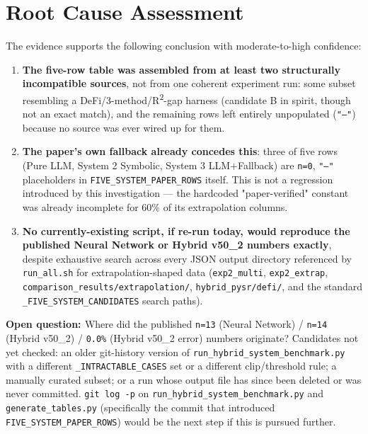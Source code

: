 \documentclass[11pt]{article}
\newcommand{\open}[1]{\par\noindent\textbf{\textcolor{orange!80!black}{Open question: }}#1\par}
\newcommand{\code}[1]{\texttt{#1}}
\begin{document}
\section{Root Cause Assessment}

The evidence supports the following conclusion with moderate-to-high
confidence:

\begin{enumerate}
  \item \textbf{The five-row table was assembled from at least two
        structurally incompatible sources}, not from one coherent
        experiment run: some subset resembling a DeFi/3-method/R\textsuperscript{2}-gap
        harness (candidate B in spirit, though not an exact match), and
        the remaining rows left entirely unpopulated (\code{"---"}) because
        no source was ever wired up for them.
  \item \textbf{The paper's own fallback already concedes this}: three of
        five rows (Pure LLM, System 2 Symbolic, System 3 LLM+Fallback) are
        \code{n=0}, \code{"---"} placeholders in \code{FIVE\_SYSTEM\_PAPER\_ROWS}
        itself. This is not a regression introduced by this investigation
        --- the hardcoded "paper-verified" constant was already
        incomplete for 60\% of its extrapolation columns.
  \item \textbf{No currently-existing script, if re-run today, would
        reproduce the published Neural Network or Hybrid v50\_2 numbers
        exactly}, despite exhaustive search across every JSON output
        directory referenced by \code{run\_all.sh} for extrapolation-shaped
        data (\code{exp2\_multi}, \code{exp2\_extrap},
        \code{comparison\_results/extrapolation/},
        \code{hybrid\_pysr/defi/}, and the standard
        \code{\_FIVE\_SYSTEM\_CANDIDATES} search paths).
\end{enumerate}

\open{Where did the published \code{n=13} (Neural Network) /
\code{n=14} (Hybrid v50\_2) / \code{0.0\%} (Hybrid v50\_2 error) numbers
originate? Candidates not yet checked: an older git-history version of
\code{run\_hybrid\_system\_benchmark.py} with a different
\code{\_INTRACTABLE\_CASES} set or a different clip/threshold rule; a
manually curated subset; or a run whose output file has since been deleted
or was never committed. \code{git log -p} on
\code{run\_hybrid\_system\_benchmark.py} and \code{generate\_tables.py}
(specifically the commit that introduced \code{FIVE\_SYSTEM\_PAPER\_ROWS})
would be the next step if this is pursued further.}
\end{document}
